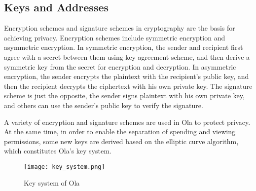 \subsection{Keys and Addresses}\label{section: zk-zkvm-keys-addresses}

Encryption schemes and signature schemes in cryptography are the basis for achieving privacy. Encryption schemes include symmetric encryption and asymmetric encryption. In symmetric encryption, the sender and recipient first agree with a secret between them using key agreement scheme, and then derive a symmetric key from the secret for encryption and decryption. In asymmetric encryption, the sender encrypts the plaintext with the recipient's public key, and then the recipient decrypts the ciphertext with his own private key. The signature scheme is just the opposite, the sender signs plaintext with his own private key, and others can use the sender's public key to verify the signature.

A variety of encryption and signature schemes are used in Ola to protect privacy. At the same time, in order to enable the separation of spending and viewing permissions, some new keys are derived based on the elliptic curve algorithm, which constitutes Ola's key system.

\begin{figure}[!htp]
    \centering
    \texttt{[image: key\_system.png]}
    \caption{Key system of Ola}
    \label{fig: key_system}
\end{figure}





